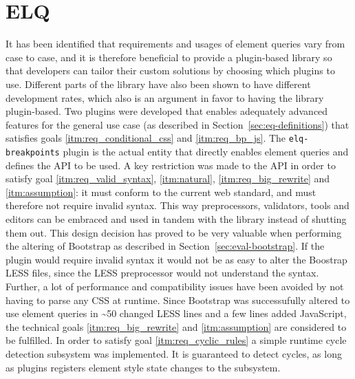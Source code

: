 \documentclass[a4paper,11pt]{kth-mag}
\newcommand{\code}[1]{\texttt{#1}}
\begin{document}
    \section{ELQ}
    It has been identified that requirements and usages of element queries vary from case to case, and it is therefore beneficial to provide a plugin-based library so that developers can tailor their custom solutions by choosing which plugins to use.
    Different parts of the library have also been shown to have different development rates, which also is an argument in favor to having the library plugin-based.
    Two plugins were developed that enables adequately advanced features for the general use case (as described in Section~\ref{sec:eq-definitions}) that satisfies goals \ref{itm:req_conditional_css} and \ref{itm:req_bp_js}.
    The \code{elq-breakpoints} plugin is the actual entity that directly enables element queries and defines the \gls{API} to be used.
    A key restriction was made to the \gls{API} in order to satisfy goal \ref{itm:req_valid_syntax}, \ref{itm:natural}, \ref{itm:req_big_rewrite} and \ref{itm:assumption}: it must conform to the current \gls{web} standard, and must therefore not require invalid syntax.
    This way preprocessors, validators, tools and editors can be embraced and used in tandem with the library instead of shutting them out.
    This design decision has proved to be very valuable when performing the altering of \gls{Bootstrap} as described in Section~\ref{sec:eval-bootstrap}.
    If the plugin would require invalid syntax it would not be as easy to alter the Boostrap \gls{LESS} files, since the \gls{LESS} preprocessor would not understand the syntax.
    Further, a lot of performance and compatibility issues have been avoided by not having to parse any \gls{CSS} at runtime.
    Since \gls{Bootstrap} was successufully altered to use element queries in \textasciitilde50 changed \gls{LESS} lines and a few lines added \gls{JavaScript}, the technical goals \ref{itm:req_big_rewrite} and \ref{itm:assumption} are considered to be fulfilled.
    In order to satisfy goal \ref{itm:req_cyclic_rules} a simple runtime cycle detection subsystem was implemented.
    It is guaranteed to detect cycles, as long as plugins registers element style state changes to the subsystem.
    
\end{document}
